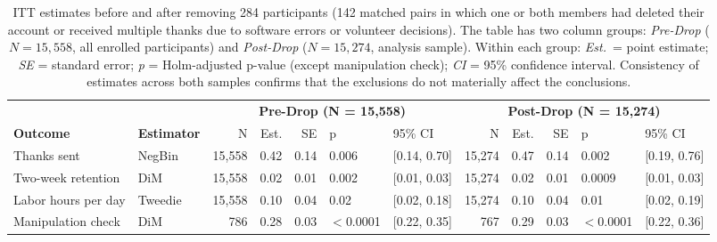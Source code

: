 \begin{table}[ht]
\centering
\small
\caption{ITT estimates before and after removing 284 participants (142 matched pairs in which one or both members had deleted their account or received multiple thanks due to software errors or volunteer decisions). The table has two column groups: \textit{Pre-Drop} ($N = 15{,}558$, all enrolled participants) and \textit{Post-Drop} ($N = 15{,}274$, analysis sample). Within each group: \textit{Est.}\ = point estimate; \textit{SE} = standard error; \textit{p} = Holm-adjusted p-value (except manipulation check); \textit{CI} = 95\% confidence interval. Consistency of estimates across both samples confirms that the exclusions do not materially affect the conclusions.}
\label{table:predrop_results}
\begin{tabular}{llrrrllrrrll}
\toprule
 & & \multicolumn{5}{c}{\textbf{Pre-Drop (N = 15,558)}} & \multicolumn{5}{c}{\textbf{Post-Drop (N = 15,274)}} \\
\cmidrule(lr){3-7} \cmidrule(lr){8-12}
\textbf{Outcome} & \textbf{Estimator} & N & Est. & SE & p & 95\% CI & N & Est. & SE & p & 95\% CI \\
\midrule
Thanks sent & NegBin & 15,558 & 0.42 & 0.14 & 0.006 & [0.14, 0.70] & 15,274 & 0.47 & 0.14 & 0.002 & [0.19, 0.76] \\
Two-week retention & DiM & 15,558 & 0.02 & 0.01 & 0.002 & [0.01, 0.03] & 15,274 & 0.02 & 0.01 & 0.0009 & [0.01, 0.03] \\
Labor hours per day & Tweedie & 15,558 & 0.10 & 0.04 & 0.02 & [0.02, 0.18] & 15,274 & 0.10 & 0.04 & 0.01 & [0.02, 0.19] \\
\addlinespace
Manipulation check & DiM & 786 & 0.28 & 0.03 & $<$0.0001 & [0.22, 0.35] & 767 & 0.29 & 0.03 & $<$0.0001 & [0.22, 0.36] \\
\bottomrule
\end{tabular}
\end{table}
